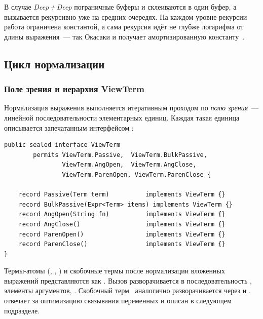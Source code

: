 В случае \emph{Deep\,+\,Deep} пограничные буферы  и
 склеиваются в один буфер, а  вызывается
рекурсивно уже на средних очередях. На каждом уровне рекурсии работа
ограничена константой, а сама рекурсия идёт не глубже логарифма от
длины выражения~--- так Окасаки и получает амортизированную
константу~\cite{okasaki_pfds}.

\subsection{Цикл нормализации}
\label{subsec:runtime-impl}

\subsubsection{Поле зрения и иерархия ViewTerm}

Нормализация выражения выполняется итеративным проходом по
\emph{полю зрения}~--- линейной последовательности элементарных единиц.
Каждая такая единица описывается запечатанным интерфейсом :

\begin{longlisting}
\caption{Иерархия ViewTerm}\label{lst:viewterm}
\begin{verbatim}
public sealed interface ViewTerm
        permits ViewTerm.Passive,  ViewTerm.BulkPassive,
                ViewTerm.AngOpen,  ViewTerm.AngClose,
                ViewTerm.ParenOpen, ViewTerm.ParenClose {

    record Passive(Term term)          implements ViewTerm {}
    record BulkPassive(Expr<Term> items) implements ViewTerm {}
    record AngOpen(String fn)          implements ViewTerm {}
    record AngClose()                  implements ViewTerm {}
    record ParenOpen()                 implements ViewTerm {}
    record ParenClose()                implements ViewTerm {}
}
\end{verbatim}
\end{longlisting}

Термы-атомы (, , ) и скобочные термы 
после нормализации вложенных выражений представляются как .
Вызов  разворачивается в последовательность
, элементы аргументов, .
Скобочный терм~ аналогично разворачивается через
 и .
 отвечает за оптимизацию связывания переменных и описан
в следующем подразделе.

